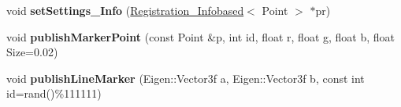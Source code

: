 \begin{DoxyCompactItemize}
\item 
\hypertarget{classRegistrationNode_a4e62d689b604dcc07a90738a48eeb112}{
void {\bfseries setSettings\_\-Info} (\hyperlink{classRegistration__Infobased}{Registration\_\-Infobased}$<$ Point $>$ $\ast$pr)}
\label{classRegistrationNode_a4e62d689b604dcc07a90738a48eeb112}

\item 
\hypertarget{classRegistrationNode_aace7037e3ac43e5d2925f2a5ae9b7248}{
void {\bfseries publishMarkerPoint} (const Point \&p, int id, float r, float g, float b, float Size=0.02)}
\label{classRegistrationNode_aace7037e3ac43e5d2925f2a5ae9b7248}

\item 
\hypertarget{classRegistrationNode_a5329c6053bf5b9a9e4e6d444612efaa1}{
void {\bfseries publishLineMarker} (Eigen::Vector3f a, Eigen::Vector3f b, const int id=rand()\%111111)}
\label{classRegistrationNode_a5329c6053bf5b9a9e4e6d444612efaa1}

\end{DoxyCompactItemize}
